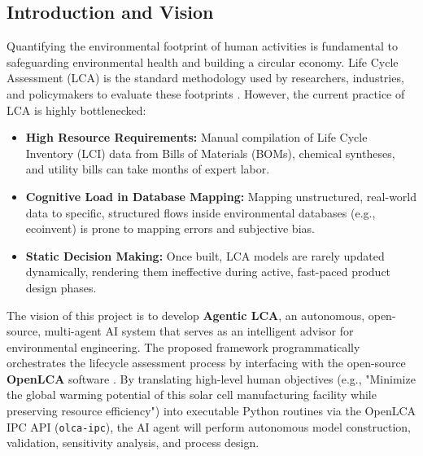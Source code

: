 \documentclass[11pt]{article}
\begin{document}
\subsection{Introduction and Vision}
Quantifying the environmental footprint of human activities is fundamental to safeguarding environmental health and building a circular economy. Life Cycle Assessment (LCA) is the standard methodology used by researchers, industries, and policymakers to evaluate these footprints \cite{ecoinvent}. However, the current practice of LCA is highly bottlenecked:
\begin{itemize}
    \item \textbf{High Resource Requirements:} Manual compilation of Life Cycle Inventory (LCI) data from Bills of Materials (BOMs), chemical syntheses, and utility bills can take months of expert labor.
    \item \textbf{Cognitive Load in Database Mapping:} Mapping unstructured, real-world data to specific, structured flows inside environmental databases (e.g., ecoinvent) is prone to mapping errors and subjective bias.
    \item \textbf{Static Decision Making:} Once built, LCA models are rarely updated dynamically, rendering them ineffective during active, fast-paced product design phases.
\end{itemize}
The vision of this project is to develop \textbf{Agentic LCA}, an autonomous, open-source, multi-agent AI system that serves as an intelligent advisor for environmental engineering. The proposed framework programmatically orchestrates the lifecycle assessment process by interfacing with the open-source \textbf{OpenLCA} software \cite{openlca}. By translating high-level human objectives (e.g., "Minimize the global warming potential of this solar cell manufacturing facility while preserving resource efficiency") into executable Python routines via the OpenLCA IPC API (\texttt{olca-ipc}), the AI agent will perform autonomous model construction, validation, sensitivity analysis, and process design.
\end{document}

